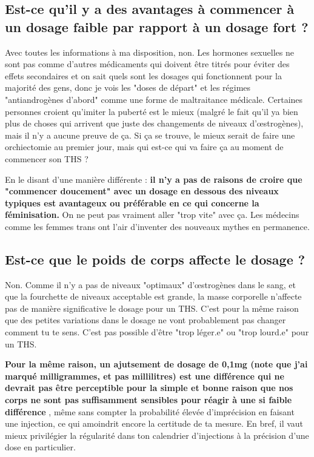 \documentclass{article}
\begin{document}
\subsection{Est-ce qu'il y a des avantages à commencer à un dosage faible par rapport à un dosage fort ?}

Avec toutes les informations à ma disposition, non. Les hormones sexuelles ne sont pas comme d'autres médicaments qui doivent être titrés pour éviter des effets secondaires et on sait quels sont les dosages qui fonctionnent pour la majorité des gens, donc je vois les "doses de départ" et les régimes "antiandrogènes d'abord" comme une forme de maltraitance médicale. Certaines personnes croient qu'imiter la puberté est le mieux (malgré le fait qu'il ya bien plus de choses qui arrivent que juste des changements de niveaux d'œstrogènes), mais il n'y a aucune preuve de ça. Si ça se trouve, le mieux serait de faire une orchiectomie au premier jour, mais qui est-ce qui va faire ça au moment de commencer son THS ?

En le disant d'une manière différente : \textbf{il n'y a pas de raisons de croire que "commencer doucement" avec un dosage en dessous des niveaux typiques est avantageux ou préférable en ce qui concerne la féminisation.} On ne peut pas vraiment aller "trop vite" avec ça. Les médecins comme les femmes trans ont l'air d'inventer des nouveaux mythes en permanence.

\subsection{Est-ce que le poids de corps affecte le dosage ?}

Non. Comme il n'y a pas de niveaux "optimaux" d'œstrogènes dans le sang, et que la fourchette de niveaux acceptable est grande, la masse corporelle n'affecte pas de manière significative le dosage pour un THS. C'est pour la même raison que des petites variations dans le dosage ne vont probablement pas changer comment tu te sens. C'est pas possible d'être "trop léger.e" ou "trop lourd.e" pour un THS.

\textbf{Pour la même raison, un ajutsement de dosage de 0,1mg (note que j'ai marqué milligrammes, et pas millilitres) est une différence qui ne devrait pas être perceptible pour la simple et bonne raison que nos corps ne sont pas suffisamment sensibles pour réagir à une si faible différence} , même sans compter la probabilité élevée d'imprécision en faisant une injection, ce qui amoindrit encore la certitude de ta mesure. En bref, il vaut mieux privilégier la régularité dans ton calendrier d'injections à la précision d'une dose en particulier.
\end{document}
